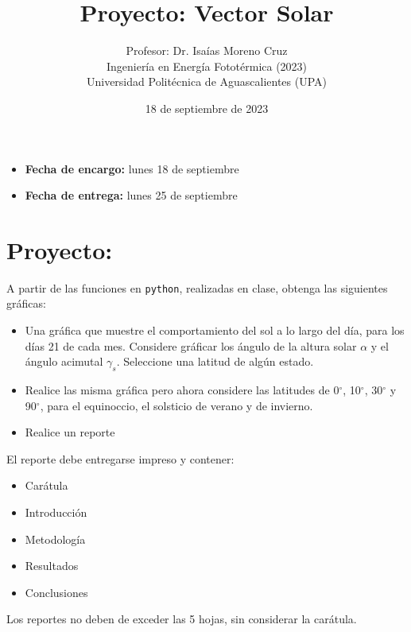 \documentclass[spanish, letterpaper,12]{article}
\begin{document}
 
 
\title{Proyecto: Vector Solar}
\author{Profesor: Dr. Isaías Moreno Cruz\\
  Ingeniería en Energía Fototérmica (2023)\\
Universidad Politécnica de Aguascalientes (UPA)}
\date{18 de septiembre de 2023}

\maketitle

\begin{itemize}[leftmargin=*, noitemsep]
\item \textbf{Fecha de encargo:} lunes 18 de septiembre
\item \textbf{Fecha de entrega:} lunes 25 de septiembre
\end{itemize}
\thispagestyle{fancy}

\section*{Proyecto:}

A partir de las funciones en \verb=python=, realizadas en clase, obtenga las siguientes gráficas:

\begin{itemize}
\item Una gráfica que muestre el comportamiento del sol a lo largo del día, para los días 21 de cada mes. Considere gráficar los ángulo de la altura solar $\alpha$ y el ángulo acimutal $\gamma_s$. Seleccione una latitud de algún estado. 
\item Realice las misma gráfica pero ahora considere las latitudes de 0$^\circ$, 10$^\circ$, 30$^\circ$ y 90$^\circ$, para el equinoccio, el solsticio de verano y de invierno.
\item Realice un reporte
\end{itemize}

El reporte debe entregarse impreso y contener:
\begin{itemize}
\item Carátula 
\item Introducción
\item Metodología
\item Resultados
\item Conclusiones
\end{itemize}

Los reportes no deben de exceder las 5 hojas, sin considerar la carátula.
\end{document}
